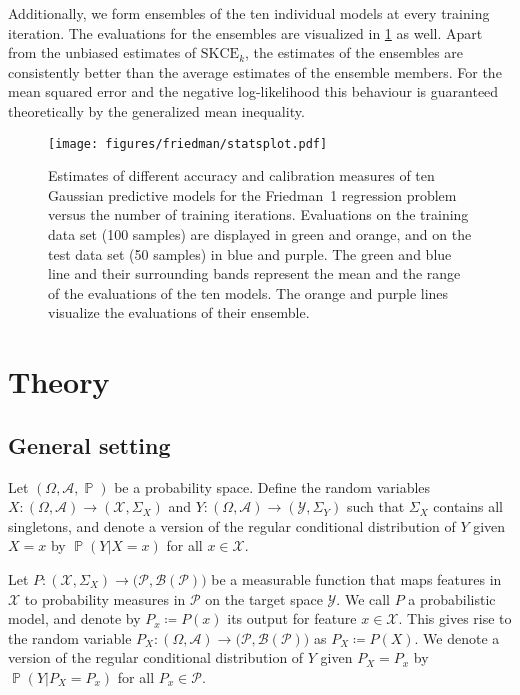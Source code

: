 \documentclass{article}
\DeclareMathOperator{\Prob}{\mathbb{P}}
\begin{document}
Additionally, we form ensembles of the ten individual models at every training
iteration. The evaluations for the ensembles are visualized in \cref{fig:friedman1} as
well. Apart from the unbiased estimates of $\mathrm{SKCE}_k$, the estimates of the
ensembles are consistently better than the average estimates of the ensemble
members. For the mean squared error and the negative log-likelihood this behaviour
is guaranteed theoretically by the generalized mean inequality.

\begin{figure}[htp]
    \begin{center}
        \texttt{[image: figures/friedman/statsplot.pdf]}
        \caption{Estimates of different accuracy and calibration measures of ten
        Gaussian predictive models for the Friedman~1 regression problem versus
        the number of training iterations.
        Evaluations on the training data set (100 samples) are displayed in green
        and orange, and on the test data set (50 samples) in blue and purple.
        The green and blue line and their surrounding bands represent
        the mean and the range of the evaluations of the ten models. The orange and
        purple lines visualize the evaluations of their ensemble.}
        \label{fig:friedman1}
    \end{center}
\end{figure}

\section{Theory}
\label{app:theory}

\subsection{General setting}

Let $(\Omega, \mathcal{A}, \Prob)$ be a probability space. Define the random
variables $X \colon (\Omega, \mathcal{A}) \to (\mathcal{X}, \Sigma_X)$
and $Y \colon (\Omega, \mathcal{A}) \to (\mathcal{Y}, \Sigma_Y)$
such that $\Sigma_X$ contains all singletons, and denote a version of the regular
conditional distribution of $Y$ given $X = x$ by $\Prob(Y|X = x)$ for all
$x \in \mathcal{X}$.

Let $P \colon (\mathcal{X}, \Sigma_X) \to \big(\mathcal{P}, \mathcal{B}(\mathcal{P})\big)$
be a measurable function that maps features in $\mathcal{X}$ to
probability measures in $\mathcal{P}$ on the target space $\mathcal{Y}$.
We call $P$ a probabilistic model, and denote by $P_x \coloneqq P(x)$ its
output for feature $x \in \mathcal{X}$. This gives rise to the random
variable $P_X \colon (\Omega, \mathcal{A}) \to \big(\mathcal{P}, \mathcal{B}(\mathcal{P})\big)$
as $P_X \coloneqq P(X)$. We denote a version of the regular conditional distribution
of $Y$ given $P_X = P_x$ by $\Prob(Y| P_X = P_x)$ for all $P_x \in \mathcal{P}$.
\end{document}
